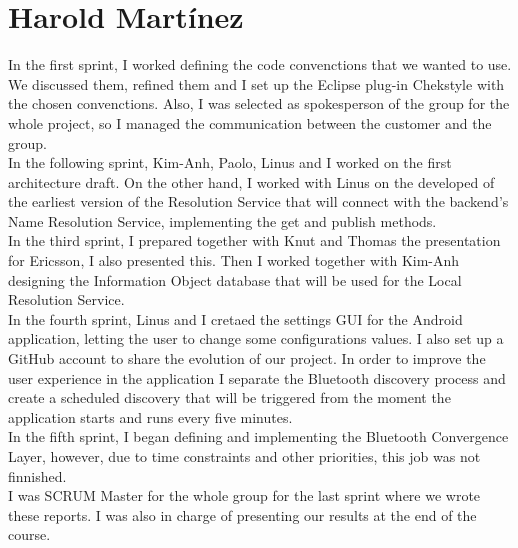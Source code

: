 \section{Harold Martínez}

In the first sprint, I worked defining the code convenctions that we wanted to use. 
We discussed them, refined them and I set up the Eclipse plug-in Chekstyle with the chosen convenctions.
Also, I was selected as spokesperson of the group for the whole project, so I managed the communication 
between the customer and the group.\\

In the following sprint, Kim-Anh, Paolo, Linus and I worked on the first architecture draft. On the other hand,
I worked with Linus on the developed of the earliest version of the Resolution Service that will connect with the 
backend's Name Resolution Service, implementing the get and publish methods.\\

In the third sprint, I prepared together with Knut and Thomas the presentation for Ericsson, I also presented this. 
Then I worked together with Kim-Anh designing the Information Object database that will be used for the 
Local Resolution Service.\\

In the fourth sprint, Linus and I cretaed the settings GUI for the Android application, letting the user to change 
some configurations values. I also set up a GitHub account to share the evolution of our project. In order to improve 
the user experience in the application I separate the Bluetooth discovery process and create a scheduled discovery that 
will be triggered from the moment the application starts and runs every five minutes.\\

In the fifth sprint, I began defining and implementing the Bluetooth Convergence Layer, however, due to time constraints 
and other priorities, this job was not finnished. \\

I was SCRUM Master for the whole group for the last sprint where we wrote these reports. I was also in charge of presenting 
our results at the end of the course.\\